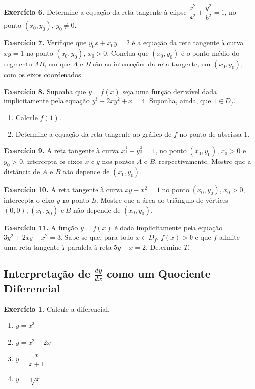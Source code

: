\documentclass[12pt,a4paper]{article}
\begin{document}
\vspace{0.5cm}
\noindent\textbf{Exercício 6.}
Determine a equação da reta tangente à elipse $\dfrac{x^2}{a^2} + \dfrac{y^2}{b^2} = 1$, no ponto $(x_0, y_0)$, $y_0 \neq 0$.

\vspace{0.5cm}
\noindent\textbf{Exercício 7.}
Verifique que $y_0 x + x_0 y = 2$ é a equação da reta tangente à curva $xy = 1$ no ponto $(x_0, y_0)$, $x_0 > 0$. Conclua que $(x_0, y_0)$ é o ponto médio do segmento $AB$, em que $A$ e $B$ são as interseções da reta tangente, em $(x_0, y_0)$, com os eixos coordenados.

\vspace{0.5cm}
\noindent\textbf{Exercício 8.}
Suponha que $y = f(x)$ seja uma função derivável dada implicitamente pela equação $y^3 + 2xy^2 + x = 4$. Suponha, ainda, que $1 \in D_f$.
\begin{enumerate}
    \renewcommand{\theenumi}{\alph{enumi}}
    \renewcommand{\labelenumi}{\theenumi)}
    \item Calcule $f(1)$.
    \item Determine a equação da reta tangente ao gráfico de $f$ no ponto de abscissa 1.
\end{enumerate}

\vspace{0.5cm}
\noindent\textbf{Exercício 9.}
A reta tangente à curva $x^{\frac{2}{3}} + y^{\frac{2}{3}} = 1$, no ponto $(x_0, y_0)$, $x_0 > 0$ e $y_0 > 0$, intercepta os eixos $x$ e $y$ nos pontos $A$ e $B$, respectivamente. Mostre que a distância de $A$ e $B$ não depende de $(x_0, y_0)$.

\vspace{0.5cm}
\noindent\textbf{Exercício 10.}
A reta tangente à curva $xy - x^2 = 1$ no ponto $(x_0, y_0)$, $x_0 > 0$, intercepta o eixo $y$ no ponto $B$. Mostre que a área do triângulo de vértices $(0,0)$, $(x_0, y_0)$ e $B$ não depende de $(x_0, y_0)$.

\vspace{0.5cm}
\noindent\textbf{Exercício 11.}
A função $y = f(x)$ é dada implicitamente pela equação $3y^2 + 2xy - x^2 = 3$. Sabe-se que, para todo $x \in D_f$, $f(x) > 0$ e que $f$ admite uma reta tangente $T$ paralela à reta $5y - x = 2$. Determine $T$.

\subsection{Interpretação de $\frac{dy}{dx}$ como um Quociente Diferencial}
\vspace{0.5cm}
\noindent\textbf{Exercício 1.} Calcule a diferencial.
\begin{enumerate}
    \renewcommand{\theenumi}{\alph{enumi}}
    \renewcommand{\labelenumi}{\theenumi)}
    \item $y = x^3$
    \item $y = x^2 - 2x$
    \item $y = \dfrac{x}{x + 1}$
    \item $y = \sqrt[3]{x}$
\end{enumerate}
\end{document}

